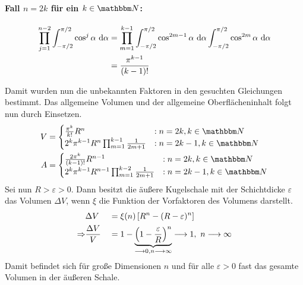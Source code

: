 	\paragraph{Fall $n=2k$ für ein $k\in\SN$:}
	\begin{alignat}{2}
		\prod_{j=1}^{n-2} \int_{-\pi/2}^{\pi/2} \cos^j\alpha\ \mathrm{d} \alpha &= \prod_{m=1}^{k-1} \int_{-\pi/2}^{\pi/2} \cos^{2m-1}\alpha\ \mathrm{d} \alpha \int_{-\pi/2}^{\pi/2} \cos^{2m}\alpha\ \mathrm{d} \alpha \nonumber \\
		&= \dfrac{\pi^{k-1}}{(k-1)!} \nonumber
	\end{alignat}

	Damit wurden nun die unbekannten Faktoren in den gesuchten Gleichungen bestimmt.
	Das allgemeine Volumen und der allgemeine Oberflächeninhalt folgt nun durch Einsetzen.
	\begin{alignat}{2}
		V &=
		\begin{cases}
			\frac{\pi^k}{k!}R^n & :n=2k, k\in\SN \\
			2^{k}\pi^{k-1}R^n \prod_{m=1}^{k-1} \frac{1}{2m+1} & :n=2k-1, k\in\SN \\
		\end{cases}
		\nonumber \\
		A &=
		\begin{cases}
			\frac{2\pi^k}{(k-1)!}R^{n-1} & :n=2k, k\in\SN \\
			2^{k}\pi^{k-1}R^{n-1} \prod_{m=1}^{k-2} \frac{1}{2m+1} & :n=2k-1, k\in\SN \\
		\end{cases}
		\nonumber
	\end{alignat}
	\newpage
	Sei nun $R>\varepsilon > 0$.
	Dann besitzt die äußere Kugelschale mit der Schichtdicke $\varepsilon$ das Volumen $\Delta V$, wenn $\xi$ die Funktion der Vorfaktoren des Volumens darstellt.
	\begin{alignat}{2}
		&\Delta V &&= \xi(n) \boxb{ R^n - (R-\varepsilon)^n } \nonumber \\
		\Rightarrow &\frac{\Delta V}{V} &&= 1 - \underbrace{\curvb{ 1-\frac{\varepsilon}{R} }^n }_{\mathclap{\longrightarrow 0, n\longrightarrow \infty}} \longrightarrow 1, \ n\longrightarrow\infty \nonumber
	\end{alignat}
	Damit befindet sich für große Dimensionen $n$ und für alle $\varepsilon>0$ fast das gesamte Volumen in der äußeren Schale.

